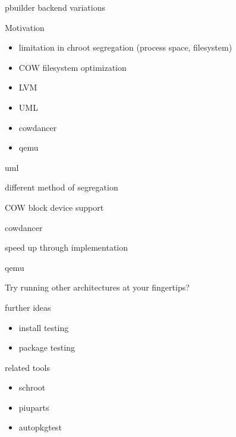 \documentclass[dvipdfm,12pt,times]{beamer}
\begin{document}
\begin{frame}{pbuilder backend variations}
\begin{minipage}{0.5\hsize}
 Motivation
\begin{itemize}
 \item limitation in chroot segregation (process space, filesystem)
 \item COW filesystem optimization
\end{itemize}
\end{minipage}\begin{minipage}{0.4\hsize}
  \begin{itemize}
  \item LVM
  \item UML
  \item cowdancer
  \item qemu
 \end{itemize}
\end{minipage}
\end{frame}

\begin{frame}{uml}
 
 different method of segregation
 
 COW block device support
\end{frame}

\begin{frame}{cowdancer}
 
 speed up through implementation 
\end{frame}

\begin{frame}{qemu}

 Try running other architectures at your fingertips?
\end{frame}


\begin{frame}{further ideas}
 \begin{itemize}
  \item install testing
  \item package testing
 \end{itemize}
\end{frame}

\begin{frame}{related tools}
 \begin{itemize}
  \item schroot
  \item piuparts
  \item autopkgtest
 \end{itemize}
\end{frame}
\end{document}
